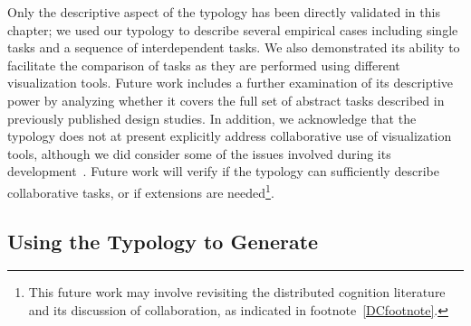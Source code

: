 Only the descriptive aspect of the typology has been directly validated in this chapter; we used our typology to describe several empirical cases including single tasks and a sequence of interdependent tasks.
We also demonstrated its ability to facilitate the comparison of tasks as they are performed using different visualization tools.
Future work includes a further examination of its descriptive power by analyzing whether it covers the full set of abstract tasks described in previously published design studies.
In addition, we acknowledge that the typology does not at present explicitly address collaborative use of visualization tools, although we did consider some of the issues involved during its development~\cite{Isenberg2008}.
Future work will verify if the typology can sufficiently describe collaborative tasks, or if extensions are needed\footnote{This future work may involve revisiting the distributed cognition literature and its discussion of collaboration, as indicated in footnote~\ref{DCfootnote}.}.


\subsection{Using the Typology to Generate}
\label{typology:discussion:generate}


